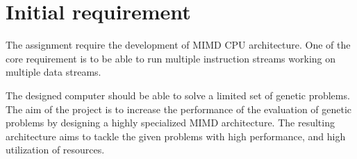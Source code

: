\section {Initial requirement}
The assignment require the development of MIMD CPU architecture.
One of the core requirement is to be able to run multiple instruction streams working on multiple data streams.

The designed computer should be able to solve a limited set of genetic problems.
The aim of the project is to increase the performance of the evaluation of genetic problems by designing a highly specialized MIMD architecture.
The resulting architecture aims to tackle the given problems with high performance, and high utilization of resources.
